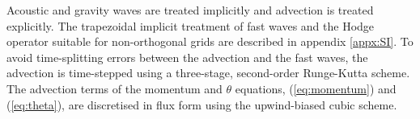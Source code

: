 Acoustic and gravity waves are treated implicitly and advection is treated explicitly. The trapezoidal implicit treatment of fast waves and the Hodge operator suitable for non-orthogonal grids are described in appendix \ref{appx:SI}. To avoid time-splitting errors between the advection and the fast waves, the advection is time-stepped using a three-stage, second-order Runge-Kutta scheme. The advection terms of the momentum and $\theta$ equations, (\ref{eq:momentum}) and (\ref{eq:theta}), are discretised in flux form using the upwind-biased cubic scheme.

